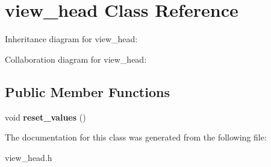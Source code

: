\hypertarget{classview__head}{}\section{view\+\_\+head Class Reference}
\label{classview__head}


Inheritance diagram for view\+\_\+head\+:


Collaboration diagram for view\+\_\+head\+:
\subsection*{Public Member Functions}
\begin{DoxyCompactItemize}
\item 
void {\bfseries reset\+\_\+values} ()\hypertarget{classview__head_ae6439c3c99c2c4c70a7dbe1ba13a56f6}{}\label{classview__head_ae6439c3c99c2c4c70a7dbe1ba13a56f6}

\end{DoxyCompactItemize}


The documentation for this class was generated from the following file\+:\begin{DoxyCompactItemize}
\item 
view\+\_\+head.\+h\end{DoxyCompactItemize}

